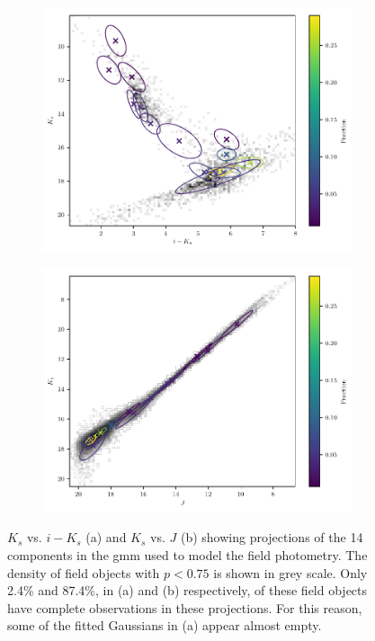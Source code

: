 \begin{figure}[ht!]
    \centering
    \begin{subfigure}[t]{0.7\textwidth}
        \includegraphics[page=1,width=\textwidth]{background/Figures/Field_GMM_BIC_[0,4].pdf}
        
        \caption{}
    \end{subfigure}
    \begin{subfigure}[t]{0.7\textwidth}
      \includegraphics[page=1,width=\textwidth]{background/Figures/Field_GMM_BIC_[2,4].pdf}
         
        \caption{}
    \end{subfigure}
\caption{$K_s$ vs. $i-K_s$ (a) and $K_s$ vs. $J$ (b) showing projections of the 14 components in the \gls{gmm} used to model the field photometry. The density of field objects with $p <0.75$ \cite[according to][there are 98010 field objects]{Bouy2015} is shown in grey scale. Only 2.4\% and  87.4\%, in (a) and (b) respectively, of these field objects have complete observations in these projections. For this reason, some of the fitted Gaussians in (a) appear almost empty.}
\label{fig:fphGMM}
\end{figure}

